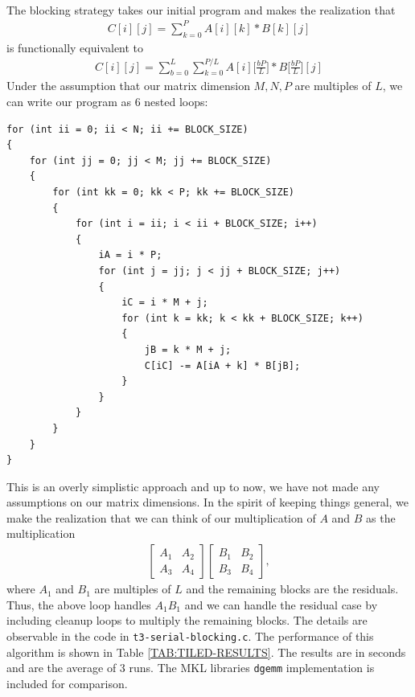 \documentclass{article}
\begin{document}
\

\noindent The blocking strategy takes our initial program and makes the realization that 
\begin{align*}
    C[i][j] = \sum_{k = 0}^P A[i][k] * B[k][j]
\end{align*}
is functionally equivalent to 
\begin{align*}
    C[i][j] = \sum_{b = 0}^L \sum_{k = 0}^{P / L} A[i]\bigg[\frac{bP}{L}\bigg] * B\bigg[\frac{bP}{L}\bigg][j] 
\end{align*}
Under the assumption that our matrix dimension $M, N, P$ are multiples of $L$, we can write 
our program as 6 nested loops:
\begin{lstlisting}
for (int ii = 0; ii < N; ii += BLOCK_SIZE)
{
    for (int jj = 0; jj < M; jj += BLOCK_SIZE)
    {
        for (int kk = 0; kk < P; kk += BLOCK_SIZE)
        {
            for (int i = ii; i < ii + BLOCK_SIZE; i++)
            {
                iA = i * P;
                for (int j = jj; j < jj + BLOCK_SIZE; j++)
                {
                    iC = i * M + j;
                    for (int k = kk; k < kk + BLOCK_SIZE; k++)
                    {
                        jB = k * M + j;
                        C[iC] -= A[iA + k] * B[jB];
                    }
                }
            }
        }
    }
}
\end{lstlisting}
This is an overly simplistic approach and up to now, we have not made any assumptions 
on our matrix dimensions. In the spirit of keeping things general, we make the realization 
that we can think of our multiplication of $A$ and $B$ as the multiplication 
\begin{align*}
    \begin{bmatrix}
        A_{1} & A_{2} \\ A_{3} & A_{4}
    \end{bmatrix}
    \begin{bmatrix}
        B_{1} & B_{2} \\ B_{3} & B_{4}
    \end{bmatrix},
\end{align*}
where $A_{1}$ and $B_{1}$ are multiples of $L$ and the remaining blocks are the residuals. 
Thus, the above loop handles $A_1 B_1$ and we can handle the residual case by including cleanup loops
to multiply the remaining blocks. The details are observable in the code in \texttt{t3-serial-blocking.c}. 
The performance of this algorithm is shown in Table \ref{TAB:TILED-RESULTS}. The results are in seconds and
are the average of 3 runs. The MKL libraries \texttt{dgemm} implementation is included for comparison.
\end{document}
